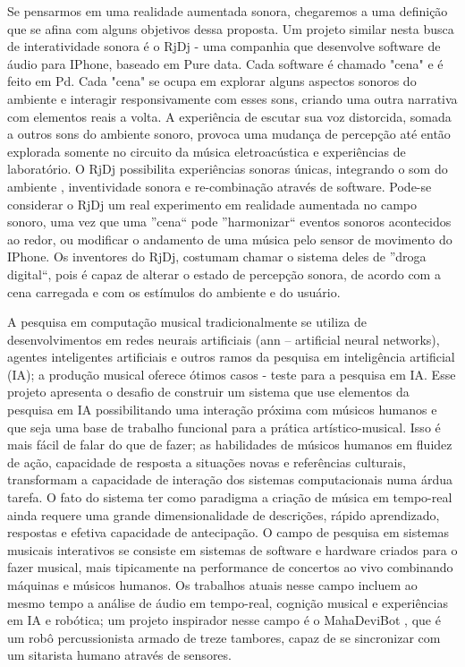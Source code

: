 \documentclass[draft]{ppgmus}
\begin{document}
    
Se pensarmos em uma realidade aumentada sonora, chegaremos a uma definição que se afina 
com alguns objetivos dessa proposta.
Um projeto similar nesta busca de interatividade sonora é o RjDj - uma companhia que desenvolve 
software de áudio para IPhone, baseado em Pure data. Cada software 
é chamado "cena" e é feito em Pd. Cada "cena" se ocupa em explorar alguns 
aspectos sonoros do ambiente e interagir responsivamente com esses sons, criando uma 
outra narrativa com elementos reais a volta. A experiência de escutar sua voz distorcida,
somada a outros sons do ambiente sonoro, provoca uma mudança de percepção até então 
explorada somente no circuito da música eletroacústica e experiências de laboratório. 
O RjDj possibilita experiências sonoras únicas, integrando o som do ambiente , 
inventividade sonora e re-combinação através de software. Pode-se considerar o 
RjDj um real experimento em realidade aumentada no campo sonoro, uma vez que uma ''cena``
pode ''harmonizar`` eventos sonoros acontecidos ao redor, ou modificar o andamento de
uma música pelo sensor de movimento do IPhone. Os inventores do RjDj, costumam chamar 
o sistema deles de ''droga digital``, pois é capaz de alterar o estado de percepção sonora,
de acordo com a cena carregada e com os estímulos do ambiente e do usuário. 



A pesquisa em computação musical tradicionalmente se utiliza de
desenvolvimentos em redes neurais artificiais (ann – artificial neural
networks), agentes inteligentes artificiais e outros ramos da pesquisa
em inteligência artificial (IA); a produção musical oferece ótimos
casos - teste para a pesquisa em IA. Esse projeto apresenta o desafio
de construir um sistema que use elementos da pesquisa em IA
possibilitando uma interação próxima com músicos humanos e que seja
uma base de trabalho funcional para a prática artístico-musical. Isso
é mais fácil de falar do que de fazer; as habilidades de músicos
humanos em fluidez de ação, capacidade de resposta a situações novas e
referências culturais, transformam a capacidade de interação dos
sistemas computacionais numa árdua tarefa. O fato do sistema ter como
paradigma a criação de música em tempo-real ainda requere uma grande
dimensionalidade de descrições, rápido aprendizado, respostas e
efetiva capacidade de antecipação. O campo de pesquisa em sistemas
musicais interativos\cite{rowe93:interactive} se consiste em sistemas de software e
hardware criados para o fazer musical, mais tipicamente na performance
de concertos ao vivo combinando máquinas e músicos humanos. Os
trabalhos atuais nesse campo incluem ao mesmo tempo a análise de áudio
em tempo-real, cognição musical e experiências em IA e robótica; um
projeto inspirador nesse campo é o MahaDeviBot \cite{kapur07:integrating}, que
é um robô percussionista armado de treze tambores, capaz de se
sincronizar com um sitarista humano através de sensores.
\end{document}
